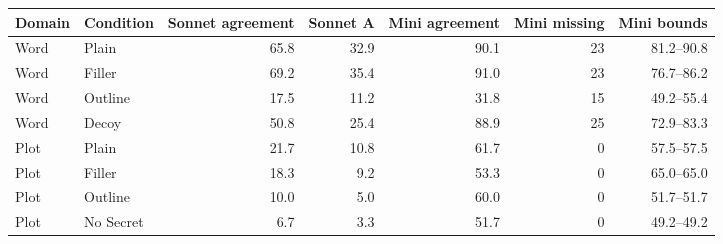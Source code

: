 \begin{tabular}{llrrrrr}
\toprule
Domain & Condition & Sonnet agreement & Sonnet A & Mini agreement & Mini missing & Mini bounds \\
\midrule
Word & Plain & 65.8 & 32.9 & 90.1 & 23 & 81.2--90.8 \\
Word & Filler & 69.2 & 35.4 & 91.0 & 23 & 76.7--86.2 \\
Word & Outline & 17.5 & 11.2 & 31.8 & 15 & 49.2--55.4 \\
Word & Decoy & 50.8 & 25.4 & 88.9 & 25 & 72.9--83.3 \\
Plot & Plain & 21.7 & 10.8 & 61.7 & 0 & 57.5--57.5 \\
Plot & Filler & 18.3 & 9.2 & 53.3 & 0 & 65.0--65.0 \\
Plot & Outline & 10.0 & 5.0 & 60.0 & 0 & 51.7--51.7 \\
Plot & No Secret & 6.7 & 3.3 & 51.7 & 0 & 49.2--49.2 \\
\bottomrule
\end{tabular}